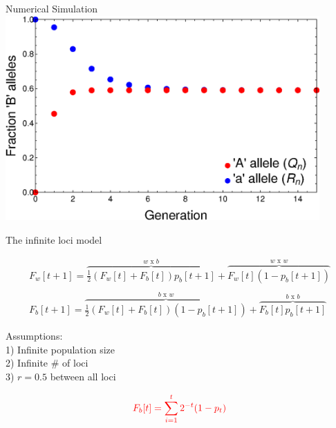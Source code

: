 \documentclass{beamer}
\begin{document}
\begin{frame}{Numerical Simulation}
\includegraphics[width=0.9\textwidth]{Figures/NumericalSolution.eps}

\end{frame}

\begin{frame}{The infinite loci model}

\begin{equation}
    \begin{array}{l}
	F_w[t+1] = \overbrace{\frac{1}{2} (F_w[t]+F_b[t]) p_b[t+1]}^\text{$w$ x $b$}  + \overbrace{F_w[t] (1-p_b[t+1])}^\text{$w$ x $w$}
	 \\ \\
	F_b[t+1]  = \overbrace{\frac{1}{2} (F_w[t]+F_b[t]) (1-p_b[t+1])}^\text{$b$ x $w$} 
	+ \overbrace{F_b[t] p_b[t+1]}^\text{$b$ x $b$}
	\end{array}
\end{equation}

Assumptions: \\
1) Infinite population size \\
2) Infinite \# of loci \\
3) $r = 0.5$ between all loci 
    
\begin{equation*}
    \color{red} F_b[t] = \sum_{i=1}^t 2^{-t} (1-p_t)
\end{equation*}
\end{frame}
\end{document}

